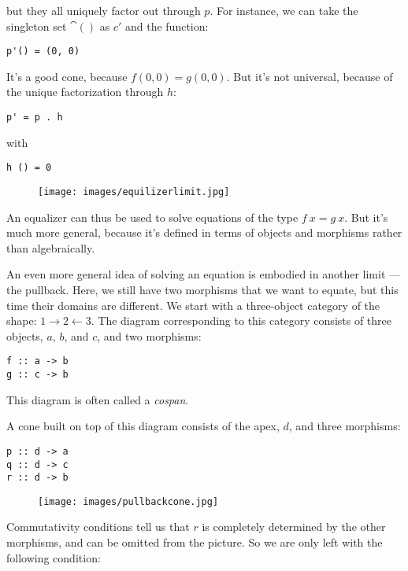 but they all uniquely factor out through $p$. For instance, we
can take the singleton set $\cat{()}$ as $c\prime$ and the
function:

\begin{Verbatim}
p'() = (0, 0)
\end{Verbatim}

It's a good cone, because $f (0, 0) = g (0, 0)$. But it's
not universal, because of the unique factorization through $h$:

\begin{Verbatim}
p' = p . h
\end{Verbatim}

with

\begin{Verbatim}
h () = 0
\end{Verbatim}

\begin{figure}[H]
\centering
\texttt{[image: images/equilizerlimit.jpg]}
\end{figure}

\noindent
An equalizer can thus be used to solve equations of the type
$f~x = g~x$. But it's much more general, because it's defined
in terms of objects and morphisms rather than algebraically.

An even more general idea of solving an equation is embodied in another
limit --- the pullback. Here, we still have two morphisms that we want
to equate, but this time their domains are different. We start with a
three-object category of the shape:
$1\rightarrow2\leftarrow3$. The diagram corresponding to
this category consists of three objects, $a$, $b$, and
$c$, and two morphisms:

\begin{Verbatim}
f :: a -> b
g :: c -> b
\end{Verbatim}

This diagram is often called a \emph{cospan}.

A cone built on top of this diagram consists of the apex, $d$,
and three morphisms:

\begin{Verbatim}
p :: d -> a
q :: d -> c
r :: d -> b
\end{Verbatim}

\begin{figure}[H]
\centering
\texttt{[image: images/pullbackcone.jpg]}
\end{figure}

\noindent
Commutativity conditions tell us that $r$ is completely
determined by the other morphisms, and can be omitted from the picture.
So we are only left with the following condition:

